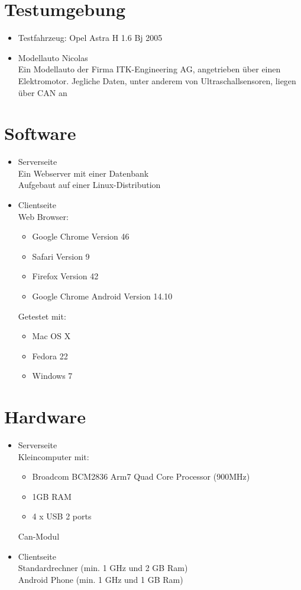 \documentclass[pflichtenheft.tex]{subfiles}
\begin{document}
\section*{Testumgebung}
\begin{itemize}
\item
Testfahrzeug: Opel Astra H 1.6 Bj 2005 %
\item
Modellauto Nicolas\\
Ein Modellauto der Firma ITK-Engineering AG, angetrieben über einen Elektromotor. Jegliche Daten, unter anderem von Ultraschallsensoren, liegen über CAN an
\end{itemize}


\section{Software}
\begin{itemize}
\item
Serverseite\\
Ein Webserver mit einer Datenbank\\
Aufgebaut auf einer Linux-Distribution
\item
Clientseite\\
Web Browser:
\begin{itemize}
\item
Google Chrome Version 46
\item
Safari Version 9
\item
Firefox Version 42
\item
Google Chrome Android Version 14.10
\end{itemize}
Getestet mit:
\begin{itemize}
\item
Mac OS X
\item
Fedora 22
\item
Windows 7
\end{itemize}
\end{itemize}


\section{Hardware}
\begin{itemize}
\item
Serverseite\\
Kleincomputer mit:
\begin{itemize}
\item
Broadcom BCM2836 Arm7 Quad Core Processor (900MHz)
\item
1GB RAM
\item
4 x USB 2 ports
\end{itemize}
Can-Modul
\item
Clientseite\\
Standardrechner (min. 1 GHz und 2 GB Ram)\\
Android Phone (min. 1 GHz und 1 GB Ram)
\end{itemize}
\end{document}
